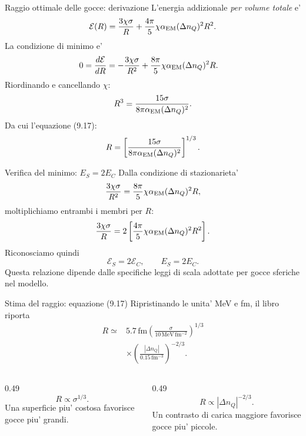 \begin{frame}{Raggio ottimale delle gocce: derivazione}
\footnotesize
L'energia addizionale \emph{per volume totale} e'
\[
\mathcal E(R)=\frac{3\chi\sigma}{R}
+\frac{4\pi}{5}\chi\alpha_{\rm EM}(\Delta n_Q)^2R^2.
\]
La condizione di minimo e'
\[
\begin{aligned}
0=\frac{d\mathcal E}{dR}
&=-\frac{3\chi\sigma}{R^2}
+\frac{8\pi}{5}\chi\alpha_{\rm EM}(\Delta n_Q)^2R.
\end{aligned}
\]
Riordinando e cancellando $\chi$:
\[
R^3=\frac{15\sigma}
{8\pi\alpha_{\rm EM}(\Delta n_Q)^2}.
\]
Da cui l'equazione (9.17):
\[
R=\left[\frac{15\sigma}
{8\pi\alpha_{\rm EM}(\Delta n_Q)^2}\right]^{1/3}.
\]
\end{frame}

\begin{frame}{Verifica del minimo: $E_S=2E_C$}
\small
Dalla condizione di stazionarieta'
\[
\frac{3\chi\sigma}{R^2}
=\frac{8\pi}{5}\chi\alpha_{\rm EM}(\Delta n_Q)^2R,
\]
moltiplichiamo entrambi i membri per $R$:
\[
\frac{3\chi\sigma}{R}
=2\left[\frac{4\pi}{5}\chi\alpha_{\rm EM}
(\Delta n_Q)^2R^2\right].
\]
Riconosciamo quindi
\[
\mathcal E_S=2\mathcal E_C,
\qquad E_S=2E_C.
\]
Questa relazione dipende dalle specifiche leggi di scala
adottate per gocce sferiche nel modello.
\end{frame}

\begin{frame}{Stima del raggio: equazione (9.17)}
\small
Ripristinando le unita' MeV e fm, il libro riporta
\[
\begin{aligned}
R\simeq{}&5.7\,\mathrm{fm}
\left(\frac{\sigma}{10\,\mathrm{MeV\,fm^{-2}}}\right)^{1/3}\\
&\times\left(\frac{|\Delta n_Q|}{0.15\,\mathrm{fm^{-3}}}\right)^{-2/3}.
\end{aligned}
\]
\begin{columns}[T,onlytextwidth]
\begin{column}{0.49\textwidth}
\[
R\propto\sigma^{1/3}.
\]
Una superficie piu' costosa favorisce gocce piu' grandi.
\end{column}
\begin{column}{0.49\textwidth}
\[
R\propto|\Delta n_Q|^{-2/3}.
\]
Un contrasto di carica maggiore favorisce gocce piu' piccole.
\end{column}
\end{columns}
\end{frame}


